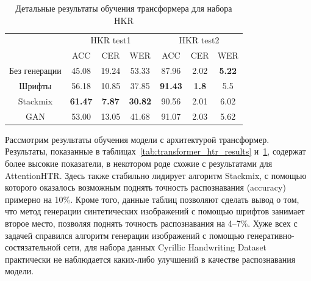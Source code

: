 \begin{table}[h!]
    \centering
    \begin{tabular}{|c|c|c|c|c|c|c|}
        \hline
        & \multicolumn{3}{c|}{HKR test1} & \multicolumn{3}{c|}{HKR test2} \\
        \cline{2-7}
                         &  ACC           &  CER           &  WER           &  ACC           &  CER           &  WER           \\
        \hline
        \hline
        Без генерации    & 45.08          & 19.24          & 53.33          & 87.96          & 2.02           & \textbf{5.22}  \\
        Шрифты           & 56.18          & 10.85          & 37.85          & \textbf{91.43} & \textbf{1.8}   & 5.5            \\
        Stackmix         & \textbf{61.47} & \textbf{7.87}  & \textbf{30.82} & 90.56          & 2.01           & 6.02           \\
        GAN              & 53.00          & 13.05          & 41.68          & 91.07          & 2.03           & 5.62           \\
        \hline
    \end{tabular}
    \caption{Детальные результаты обучения трансформера для набора HKR}
    \label{tab:transformer_htr_results_hkr}
\end{table}

Рассмотрим результаты обучения модели с архитектурой трансформер.
Результаты, показанные в таблицах~\ref{tab:transformer_htr_results} и~\ref{tab:transformer_htr_results_hkr},
содержат более высокие показатели, в некотором роде схожие с результатами для AttentionHTR.
Здесь также стабильно лидирует алгоритм Stackmix, с помощью которого оказалось возможным поднять точность распознавания (accuracy)
примерно на 10\%.
Кроме того, данные таблиц позволяют сделать вывод о том, что метод генерации синтетических изображений с помощью шрифтов
занимает второе место, позволяя поднять точность распознавания на 4--7\%.
Хуже всех с задачей справился алгоритм генерации изображений с помощью генеративно-состязательной сети,
для набора данных Cyrillic Handwriting Dataset практически не наблюдается каких-либо улучшений в качестве распознавания модели.

